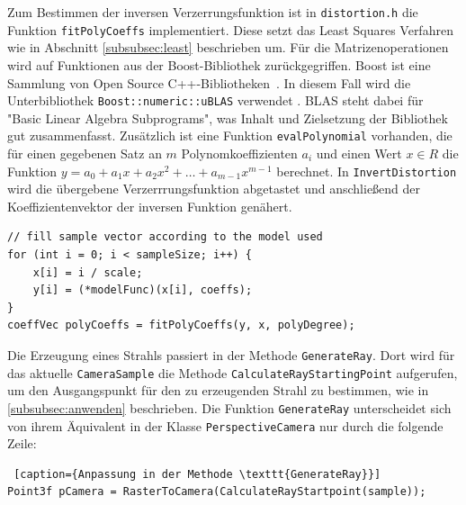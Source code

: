 Zum Bestimmen der inversen Verzerrungsfunktion ist in \texttt{distortion.h} die Funktion \texttt{fitPolyCoeffs} implementiert. Diese setzt das Least Squares Verfahren wie in Abschnitt \ref{subsubsec:least} beschrieben um. Für die Matrizenoperationen wird auf Funktionen aus der Boost-Bibliothek zurückgegriffen. Boost ist eine Sammlung von Open Source C++-Bibliotheken~\cite{boost}. In diesem Fall wird die Unterbibliothek \texttt{Boost::numeric::uBLAS} verwendet \cite{ublas}. BLAS steht dabei für "Basic Linear Algebra Subprograms", was Inhalt und Zielsetzung der Bibliothek gut zusammenfasst. Zusätzlich ist eine Funktion \texttt{evalPolynomial} vorhanden, die für einen gegebenen Satz an $m$ Polynomkoeffizienten $a_i$ und einen Wert $x \in R$ die Funktion $y = a_0 + a_1 x + a_2 x^2 + \dots + a_{m-1} x^{m-1}$ berechnet. In \texttt{InvertDistortion} wird die übergebene Verzerrrungsfunktion abgetastet und anschließend der Koeffizientenvektor der inversen Funktion genähert.
\begin{lstlisting}[caption={"Abtasten" des Verzerrungsmodells und Invertierung}]
// fill sample vector according to the model used
for (int i = 0; i < sampleSize; i++) {
	x[i] = i / scale;
	y[i] = (*modelFunc)(x[i], coeffs);
}
coeffVec polyCoeffs = fitPolyCoeffs(y, x, polyDegree);
\end{lstlisting}

Die Erzeugung eines Strahls passiert in der Methode \texttt{GenerateRay}. Dort wird für das aktuelle \texttt{CameraSample} die Methode \texttt{CalculateRayStartingPoint} aufgerufen, um den Ausgangspunkt für den zu erzeugenden Strahl zu bestimmen, wie in \ref{subsubsec:anwenden} beschrieben.
Die Funktion \texttt{GenerateRay} unterscheidet sich von ihrem Äquivalent in der Klasse \texttt{PerspectiveCamera} nur durch die folgende Zeile:
\begin{lstlisting} [caption={Anpassung in der Methode \texttt{GenerateRay}}]
Point3f pCamera = RasterToCamera(CalculateRayStartpoint(sample));
\end{lstlisting}

